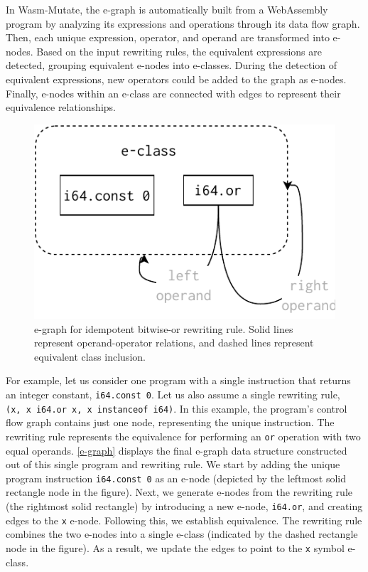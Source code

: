 \documentclass[a4paper,fleqn]{cas-dc}
\newcommand{\tool}{{\sc Wasm-Mutate}\xspace}
\begin{document}
In \tool, the e-graph is automatically built from a WebAssembly program by analyzing its expressions and operations through its data flow graph.
Then, each unique expression, operator, and operand are transformed into e-nodes.
Based on the input rewriting rules, the equivalent expressions are detected, grouping equivalent e-nodes into e-classes.
During the detection of equivalent expressions, new operators could be added to the graph as e-nodes.
Finally, e-nodes within an e-class are connected with edges to represent their equivalence relationships.

\begin{figure}
    \centering
    \includegraphics[width=1.0\linewidth]{figures/egraph1.pdf}
    \caption{e-graph for idempotent bitwise-or rewriting rule. Solid lines represent operand-operator relations, and dashed lines represent equivalent class inclusion. }
  \label{e-graph}
\end{figure}

For example, let us consider one program with a single instruction that returns an integer constant, \texttt{i64.const 0}. Let us also assume a single rewriting rule, \texttt{(x,\ x\ i64.or\ x, x instanceof i64)}. 
In this example, the program's control flow graph contains just one node, representing the unique instruction.
The rewriting rule represents the equivalence for performing an \texttt{or} operation with two equal operands.
\autoref{e-graph} displays the final e-graph data structure constructed out of this single program and rewriting rule. 
We start by adding the unique program instruction \texttt{i64.const 0} as an e-node (depicted by the leftmost solid rectangle node in the figure). 
Next, we generate e-nodes from the rewriting rule (the rightmost solid rectangle) by introducing a new e-node, \texttt{i64.or}, and creating edges to the \texttt{x} e-node.
Following this, we establish equivalence. 
The rewriting rule combines the two e-nodes into a single e-class (indicated by the dashed rectangle node in the figure). 
As a result, we update the edges to point to the \texttt{x} symbol e-class.
\end{document}
